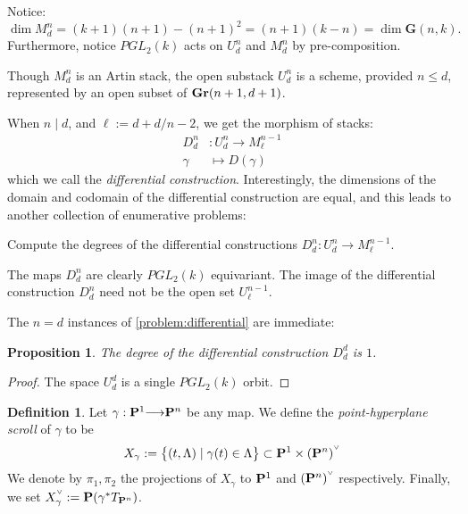 \documentclass[11pt,reqno]{amsart}
\theoremstyle{plain}
\newtheorem{proposition}[theorem]{Proposition}
\theoremstyle{definition}
\newtheorem{definition}[theorem]{Definition}
\theoremstyle{remark}
\numberwithin{equation}{section}
\newcommand{\todo}[1]{\fbox{ToDo: #1}}
\renewcommand{\to}{{\longrightarrow}}
\numberwithin{equation}{section}
\newcommand{\G}{\mathbf G}
\newcommand{\smvee}{\raise0.5ex\hbox{$\scriptscriptstyle\vee$}}
\begin{document}
\begin{remark}
Notice:  $\dim M^{n}_d= (k+1)(n+1) - (n+1)^{2} = (n+1)(k-n) = \dim \G(n, k).$  Furthermore, notice  $PGL_{2}(k)$ acts on $U^{n}_{d}$ and $M^{n}_{d}$ by pre-composition. 
\end{remark}  

\begin{remark}
  Though $M^{n}_{d}$ is an Artin stack, the open substack $U^{n}_{d}$ is a scheme, provided $n \leq d$, represented by an open subset of $\Gr(n+1,d+1)$. 
\end{remark}




When $n \mid d$, and $\ell := d+d/n-2$, we get the morphism of stacks: 
\begin{align*}
  D^{n}_{d} &: U^{n}_{d} \to M^{n-1}_{\ell}\\
  \gamma &\longmapsto D(\gamma)
\end{align*}
which we call the {\sl differential construction}. Interestingly, the dimensions of the domain and codomain of the differential construction are equal, and this leads to another collection of enumerative problems: 
\begin{problem}\label{problem:differential}
   Compute the degrees of the differential constructions $D^{n}_{d} : U^{n}_{d} \to M^{n-1}_{\ell}$. 
 \end{problem} 

\begin{remark}
  The maps $D^{n}_{d}$ are clearly $PGL_{2}(k)$ equivariant.  The image of the differential construction $D^{n}_{d}$ need not be the open set $U^{n-1}_{\ell}$. \todo{Sure?}
\end{remark}


 The $n=d$ instances of \autoref{problem:differential} are immediate: 

 \begin{proposition}\label{proposition:trivialdegree}
   The degree of the differential construction $D^{d}_{d}$ is $1$.
 \end{proposition}
\begin{proof}
  The space $U^{d}_{d}$ is a single $PGL_{2}(k)$ orbit.
\end{proof}
 
\begin{definition}\label{definition:pointlinescroll}
  Let $\gamma: \P^{1} \to \P^{n}$ be any map. We define the {\sl point-hyperplane scroll} of $\gamma$ to be 
  \begin{align*}
        X_{\gamma} := \big\{(t, \Lambda) \mid \gamma(t) \in \Lambda \big\} \subset \P^{1} \times (\P^{n})^{\smvee}
      \end{align*}
      We denote by $\pi_{1}, \pi_{2}$ the projections of $X_{\gamma}$ to $\P^{1}$ and $(\P^{n})^{\smvee}$ respectively. Finally, we set $X_{\gamma}^{\smvee} := \P(\gamma^{*}T_{\P^{n}})$.   
\end{definition}
\end{document}
